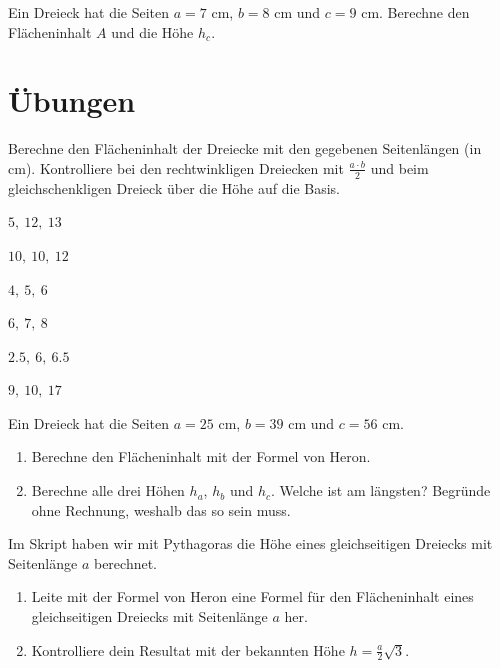 \documentclass[11pt,oneside]{article}
\begin{document}
\begin{beispiel}
	Ein Dreieck hat die Seiten $a=7$ cm, $b=8$ cm und $c=9$ cm. Berechne den Flächeninhalt $A$ und die Höhe $h_c$.
\end{beispiel}

\section{Übungen}
\setcounter{aufg}{0}
\begin{aufgabe}[Grundaufgaben] %
	Berechne den Flächeninhalt der Dreiecke mit den gegebenen Seitenlängen (in cm). Kontrolliere bei den rechtwinkligen Dreiecken mit $\frac{a\cdot b}{2}$ und beim gleichschenkligen Dreieck über die Höhe auf die Basis.
	\begin{enumcols}[3]
		\item $5,\ 12,\ 13$
		\item $10,\ 10,\ 12$
		\item $4,\ 5,\ 6$
		\item $6,\ 7,\ 8$
		\item $2.5,\ 6,\ 6.5$
		\item $9,\ 10,\ 17$
	\end{enumcols}
\end{aufgabe}

\begin{aufgabe}
	Ein Dreieck hat die Seiten $a=25$ cm, $b=39$ cm und $c=56$ cm.
	\begin{enumerate}[label=\alph*)]
		\item Berechne den Flächeninhalt mit der Formel von Heron.
		\item Berechne alle drei Höhen $h_a$, $h_b$ und $h_c$. Welche ist am längsten? Begründe ohne Rechnung, weshalb das so sein muss.
	\end{enumerate}
\end{aufgabe}

\begin{aufgabe} %
	Im Skript haben wir mit Pythagoras die Höhe eines gleichseitigen Dreiecks mit Seitenlänge $a$ berechnet.
	\begin{enumerate}[label=\alph*)]
		\item Leite mit der Formel von Heron eine Formel für den Flächeninhalt eines gleichseitigen Dreiecks mit Seitenlänge $a$ her.
		\item Kontrolliere dein Resultat mit der bekannten Höhe $h=\frac{a}{2}\sqrt3$.
	\end{enumerate}
\end{aufgabe}
\end{document}
